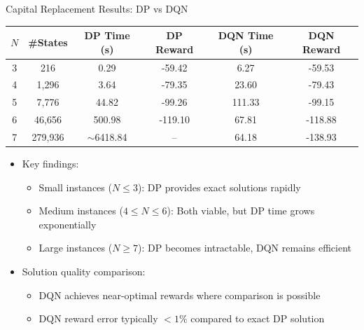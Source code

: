 \documentclass[10pt]{beamer}
\begin{document}
\begin{frame}{Capital Replacement Results: DP vs DQN}
    \begin{table}
        \centering
        \small
        \begin{tabular}{cccccc}
            \toprule
            $N$ & \#States & DP Time (s) & DP Reward & DQN Time (s) & DQN Reward \\
            \midrule
            3 & 216 & 0.29 & -59.42 & 6.27 & -59.53 \\
            4 & 1,296 & 3.64 & -79.35 & 23.60 & -79.43 \\
            5 & 7,776 & 44.82 & -99.26 & 111.33 & -99.15 \\
            6 & 46,656 & 500.98 & -119.10 & 67.81 & -118.88 \\
            7 & 279,936 & $\sim$6418.84 & -- & 64.18 & -138.93 \\
            \bottomrule
        \end{tabular}
    \end{table}
    
    \begin{itemize}
        \item Key findings:
        \begin{itemize}
            \item Small instances ($N \leq 3$): DP provides exact solutions rapidly
            \item Medium instances ($4 \leq N \leq 6$): Both viable, but DP time grows exponentially
            \item Large instances ($N \geq 7$): DP becomes intractable, DQN remains efficient
        \end{itemize}
        \item Solution quality comparison:
        \begin{itemize}
            \item DQN achieves near-optimal rewards where comparison is possible
            \item DQN reward error typically $< 1\%$ compared to exact DP solution
        \end{itemize}
    \end{itemize}
\end{frame}

\end{document}
